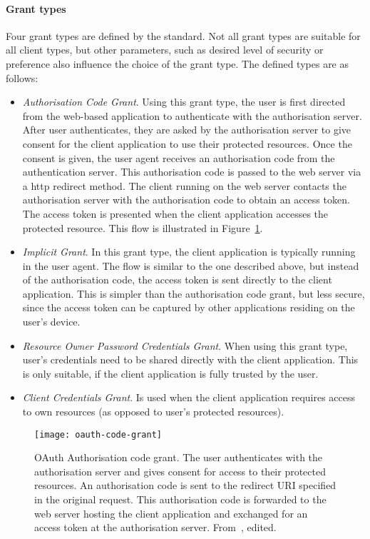 \paragraph{Grant types} Four grant types are defined by the standard. Not all grant types are suitable for all client types, but other parameters, such as desired level of security or preference also influence the choice of the grant type. The defined types are as follows:

\begin{itemize}[noitemsep]
    \item \textit{Authorisation Code Grant}. Using this grant type, the user is first directed from the web-based application to authenticate with the authorisation server. After user authenticates, they are asked by the authorisation server to give consent for the client application to use their protected resources. Once the consent is given, the user agent receives an authorisation code from the authentication server. This authorisation code is passed to the web server via a \acrshort{http} redirect method. The client running on the web server contacts the authorisation server with the authorisation code to obtain an access token. The access token is presented when the client application accesses the protected resource. This flow is illustrated in Figure~\ref{fig:oauth-code-grant}.
    \item \textit{Implicit Grant}. In this grant type, the client application is typically running in the user agent. The flow is similar to the one described above, but instead of the authorisation code, the access token is sent directly to the client application. This is simpler than the authorisation code grant, but less secure, since the access token can be captured by other applications residing on the user's device.
    \item \textit{Resource Owner Password Credentials Grant}. When using this grant type, user's credentials need to be shared directly with the client application. This is only suitable, if the client application is fully trusted by the user.
    \item \textit{Client Credentials Grant}. Is used when the client application requires access to own resources (as opposed to user's protected resources).
\end{itemize}

\begin{figure}[ht]
    \centering
    \texttt{[image: oauth-code-grant]}
    \caption{OAuth Authorisation code grant. The user authenticates with the authorisation server and gives consent for access to their protected resources. An authorisation code is sent to the redirect URI specified in the original request. This authorisation code is forwarded to the web server hosting the client application and exchanged for an access token at the authorisation server. From~\cite{Hardt2012TheFramework}, edited.}
    \label{fig:oauth-code-grant}
\end{figure}

